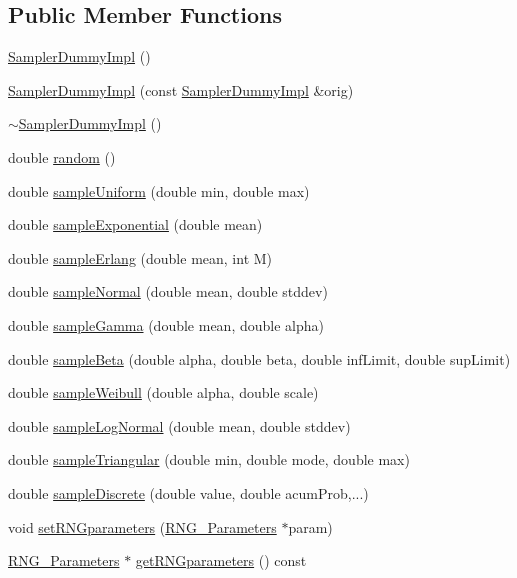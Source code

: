 \subsection*{Public Member Functions}
\begin{DoxyCompactItemize}
\item 
\hyperlink{class_sampler_dummy_impl_a48ecc488be480e66dcf213dcfedd2439}{Sampler\+Dummy\+Impl} ()
\item 
\hyperlink{class_sampler_dummy_impl_a9b4451ee9f369085ca7922971a04ca80}{Sampler\+Dummy\+Impl} (const \hyperlink{class_sampler_dummy_impl}{Sampler\+Dummy\+Impl} \&orig)
\item 
\hyperlink{class_sampler_dummy_impl_a3ad93e4863d2066c5de9f871d63028d0}{$\sim$\+Sampler\+Dummy\+Impl} ()
\item 
double \hyperlink{class_sampler_dummy_impl_a1efbfd119966bcbfd510eb68408c9d35}{random} ()
\item 
double \hyperlink{class_sampler_dummy_impl_a4f0b01653459e1aefbd051b262ee09fa}{sample\+Uniform} (double min, double max)
\item 
double \hyperlink{class_sampler_dummy_impl_a66450af98671da4448f88311bc72b72a}{sample\+Exponential} (double mean)
\item 
double \hyperlink{class_sampler_dummy_impl_a5ee1bdc1ad14274cccdb837c0acd0e8f}{sample\+Erlang} (double mean, int M)
\item 
double \hyperlink{class_sampler_dummy_impl_ac83588a3fc13bc7119bb4173f48598fa}{sample\+Normal} (double mean, double stddev)
\item 
double \hyperlink{class_sampler_dummy_impl_aad704fccd2f3c87052151f98bcd75750}{sample\+Gamma} (double mean, double alpha)
\item 
double \hyperlink{class_sampler_dummy_impl_a89e58dd93a812f08d01ca634d2de03f5}{sample\+Beta} (double alpha, double beta, double inf\+Limit, double sup\+Limit)
\item 
double \hyperlink{class_sampler_dummy_impl_ad5a3a7c2270e06880ade6762a174520c}{sample\+Weibull} (double alpha, double scale)
\item 
double \hyperlink{class_sampler_dummy_impl_a15dd7e86c3ddae3d06869e33d7f25946}{sample\+Log\+Normal} (double mean, double stddev)
\item 
double \hyperlink{class_sampler_dummy_impl_a3cf347b20e3b9eb8a200caf3d85ba827}{sample\+Triangular} (double min, double mode, double max)
\item 
double \hyperlink{class_sampler_dummy_impl_a4ae8ebac08d619b4749c166dde15c7ed}{sample\+Discrete} (double value, double acum\+Prob,...)
\item 
void \hyperlink{class_sampler_dummy_impl_ac9f0ff734adc5d09c14b44d71d1eabd0}{set\+R\+N\+Gparameters} (\hyperlink{class_sampler__if_1_1_r_n_g___parameters}{R\+N\+G\+\_\+\+Parameters} $\ast$param)
\item 
\hyperlink{class_sampler__if_1_1_r_n_g___parameters}{R\+N\+G\+\_\+\+Parameters} $\ast$ \hyperlink{class_sampler_dummy_impl_a98059084bc0162e16eea6acda07586be}{get\+R\+N\+Gparameters} () const 
\end{DoxyCompactItemize}


